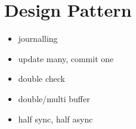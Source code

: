 \chapter{Design Pattern}

\begin{itemize}
    \item journalling
    \item update many, commit one
    \item double check
    \item double/multi buffer
    \item half sync, half async
\end{itemize}

